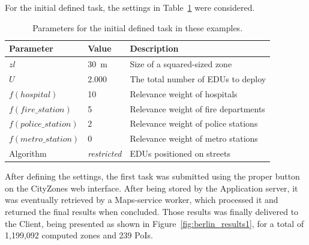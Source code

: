 \begin{refsection}
For the initial defined task, the settings in Table~\ref{tab:example_parameters} were considered.

\begin{table}[htbp!]
  \centering
  \begin{tabular}{llp{7.3cm}}
    \hline
    \textbf{Parameter}   & \textbf{Value}      & \textbf{Description} \\
    \hline
    $zl$                 & 30~m                & Size of a squared-sized zone \\
    $U$                  & 2.000               & The total number of EDUs to deploy \\
    $f(hospital)$        & 10                  & Relevance weight of hospitals \\
    $f(fire\_station)$   & 5                   & Relevance weight of fire departments \\
    $f(police\_station)$ & 2                   & Relevance weight of police stations  \\
    $f(metro\_station)$  & 0                   & Relevance weight of metro stations  \\
    Algorithm            & \textit{restricted} & EDUs positioned on streets \\
    \hline
  \end{tabular}
  \caption{Parameters for the initial defined task in these examples.}\label{tab:example_parameters}
\end{table}

After defining the settings, the first task was submitted using the proper button on the CityZones web interface. After being stored by the Application server, it was eventually retrieved by a Maps-service worker, which processed it and returned the final results when concluded. Those results was finally delivered to the Client, being presented as shown in Figure~\ref{fig:berlin_results1}, for a total of 1,199,092 computed zones and 239 PoIs. 


\end{refsection}
